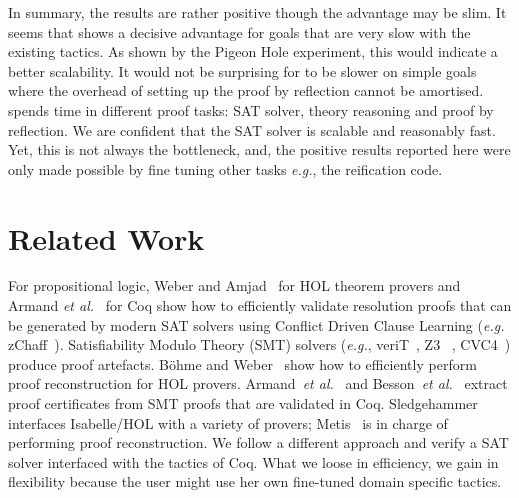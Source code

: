 \documentclass[utf8,a4paper,UKenglish,cleveref, autoref, thm-restate]{lipics-v2021}
\begin{document}
In summary, the results are rather positive though the advantage may be slim. %
%
It seems that  shows a decisive advantage for goals that
are very slow with the existing tactics.
As shown by the Pigeon Hole experiment, this would indicate a better scalability.
%
It would not be surprising for  to be slower on simple goals where
the overhead of setting up the proof by reflection cannot be amortised.
%
 spends time in different proof tasks: SAT solver, theory
reasoning and proof by reflection. We are confident that the SAT
solver is scalable and reasonably fast. Yet, this is not always the
bottleneck, and, the positive results reported here were only made possible by 
fine tuning other tasks \emph{e.g.}, the reification code.

\section{Related Work}
\label{sec:related-work}


For propositional logic, Weber and Amjad~\cite{WeberA09} for HOL
theorem provers and Armand \emph{et al.}~\cite{ArmandGST10} for Coq
show how to efficiently validate resolution proofs that can be
generated by modern SAT solvers using Conflict Driven Clause Learning
(\emph{e.g.} zChaff~\cite{MoskewiczMZZM01}).
%
Satisfiability Modulo Theory (SMT) solvers (\emph{e.g.},
veriT~\cite{BoutonODF09}, Z3~\cite{MouraB08} ,
CVC4~\cite{DetersR0BT14}) produce proof artefacts. Böhme and
Weber~\cite{BohmeW10} show how to efficiently perform proof
reconstruction for HOL provers. Armand~\emph{et
  al.}~\cite{ArmandFGKTW11} and Besson~\emph{et al.}~\cite{BessonCP11}
extract proof certificates from SMT proofs that are validated in Coq.
%
Sledgehammer~\cite{BlanchetteBP13} interfaces Isabelle/HOL with a
variety of provers; Metis~\cite{Hurd03first-orderproof,PaulsonS07} is
in charge of performing proof reconstruction.
%
We follow a different approach and verify a SAT solver interfaced with
the tactics of Coq. What we loose in efficiency, we gain in
flexibility because the user might use her own fine-tuned domain
specific tactics.
\end{document}
